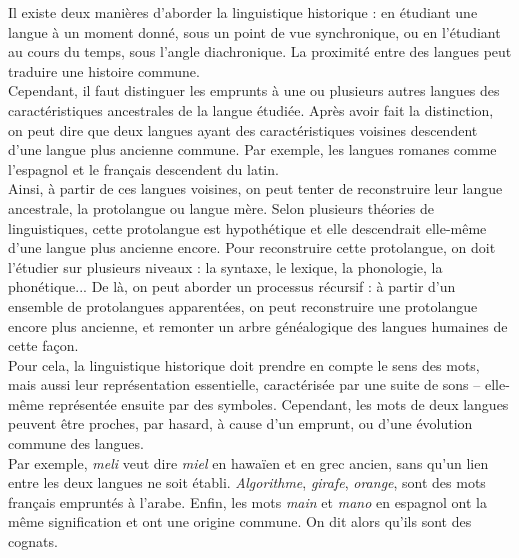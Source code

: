 \documentclass[12pt, french, twoside]{report}
\begin{document}
Il existe deux manières d'aborder la linguistique historique : en étudiant une langue à un moment donné, sous un point de vue synchronique, ou en l'étudiant au cours du temps, sous l'angle diachronique. 
La proximité entre des langues peut traduire une histoire commune.\\
Cependant, il faut distinguer les emprunts à une ou plusieurs autres langues des caractéristiques ancestrales de la langue étudiée. Après avoir fait la distinction, on peut dire que deux langues ayant des caractéristiques voisines descendent d'une langue plus ancienne commune. Par exemple, les langues romanes comme l'espagnol et le français descendent du latin.\\
Ainsi, à partir de ces langues voisines, on peut tenter de reconstruire leur langue ancestrale, la protolangue ou langue mère. Selon plusieurs théories de linguistiques, cette protolangue est hypothétique et elle descendrait elle-même d'une langue plus ancienne encore.
Pour reconstruire cette protolangue, on doit l'étudier sur plusieurs niveaux : la syntaxe, le lexique, la phonologie, la phonétique... De là, on peut aborder un processus récursif : à partir d'un ensemble de protolangues apparentées, on peut reconstruire une protolangue encore plus ancienne, et remonter un arbre généalogique des langues humaines de cette façon.\\
Pour cela, la linguistique historique doit prendre en compte le sens des mots, mais aussi leur représentation essentielle, caractérisée par une suite de sons -- elle-même représentée ensuite par des symboles. Cependant, les mots de deux langues peuvent être proches, par hasard, à cause d'un emprunt, ou d'une évolution commune des langues.\\

Par exemple, \textit{meli} veut dire \textit{miel} en hawaïen et en grec ancien, sans qu'un lien entre les deux langues ne soit établi. \textit{Algorithme}, \textit{girafe}, \textit{orange}, sont des mots français empruntés à l'arabe. Enfin, les mots \textit{main} et \textit{mano} en espagnol ont la même signification et ont une origine commune. On dit alors qu'ils sont des cognats.\\
\end{document}
